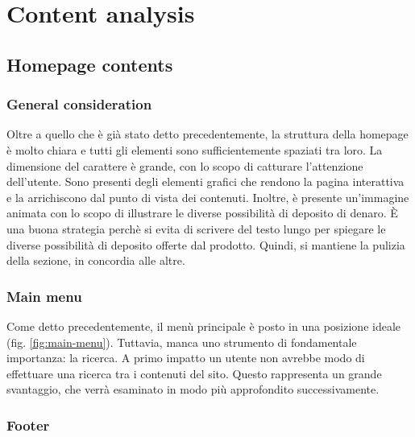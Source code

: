\section{Content analysis}

\subsection{Homepage contents}

\subsubsection{General consideration}

Oltre a quello che è già stato detto precedentemente, la struttura della 
homepage è molto chiara e tutti gli elementi sono sufficientemente 
spaziati tra loro. La dimensione del carattere è grande, con lo scopo di 
catturare l'attenzione dell'utente. Sono presenti degli elementi grafici 
che rendono la pagina interattiva e la arrichiscono dal punto di vista dei 
contenuti. Inoltre, è presente un'immagine animata con lo scopo di 
illustrare le diverse possibilità di deposito di denaro. È una buona 
strategia perchè si evita di scrivere del testo lungo per spiegare le 
diverse possibilità di deposito offerte dal prodotto. Quindi, si mantiene 
la pulizia della sezione, in concordia alle altre. 

\subsubsection{Main menu}

Come detto precedentemente, il menù principale è posto in una posizione 
ideale (fig. \ref{fig:main-menu}). Tuttavia, manca uno strumento di 
fondamentale importanza: la ricerca. A primo impatto un utente non avrebbe 
modo di effettuare una ricerca tra i contenuti del sito. Questo rappresenta 
un grande svantaggio, che verrà esaminato in modo più approfondito 
successivamente.

\subsubsection{Footer}

